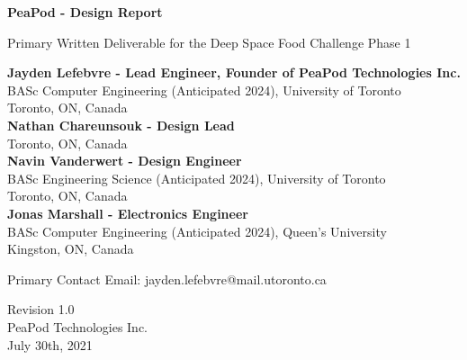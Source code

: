 \documentclass{report}
\begin{document}
\begin{titlepage}
    \begin{center}
        \vspace*{1.2cm}

        \textbf{\large{PeaPod - Design Report}}

        \vspace{0.5cm}

        Primary Written Deliverable for the Deep Space Food Challenge Phase 1

        \vfill \small{

            \textbf{Jayden Lefebvre - Lead Engineer, Founder of PeaPod Technologies Inc.}\\
            BASc Computer Engineering (Anticipated 2024), University of Toronto\\
            Toronto, ON, Canada\\
            \vspace{.5cm}
            \textbf{Nathan Chareunsouk - Design Lead}\\Toronto, ON, Canada\\
            \vspace{.5cm}
            \textbf{Navin Vanderwert - Design Engineer}\\
            BASc Engineering Science (Anticipated 2024), University of Toronto\\
            Toronto, ON, Canada\\
            \vspace{.5cm}
            \textbf{Jonas Marshall - Electronics Engineer}\\
            BASc Computer Engineering (Anticipated 2024), Queen's University\\
            Kingston, ON, Canada

        }

        \vspace{1cm}

        Primary Contact Email: jayden.lefebvre@mail.utoronto.ca

        \vspace{.75cm}

        Revision 1.0\\
        PeaPod Technologies Inc.\\
        July 30th, 2021

    \end{center}
\end{titlepage}

\thispagestyle{plain}
\end{document}

